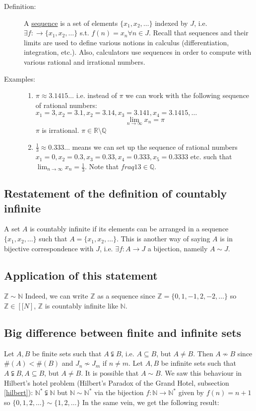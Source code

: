 	\label{lecture47}
	\begin{description}
		\item[Definition:] A \underline{sequence} is a set of elements $\{x_1, x_2, \dots\}$ indexed by $J$, i.e. $\exists f: \rightarrow \{x_1, x_2, \dots\}$ s.t. $f(n) = x_n \forall n \in J$.
			Recall that sequences and their limits are used to define various notions in calculus (differentiation, integration, etc.).
			Also, calculators use sequences in order to compute with various rational and irrational numbers.
		\item[Examples:]
			\begin{enumerate}
				\item $\pi \approx 3.1415\dots$ i.e. instead of $\pi$ we can work with the following sequence of rational numbers: $x_1 = 3, x_2 = 3.1, x_2 = 3.14, x_3 = 3.141, x_4 = 3.1415, \dots$
					$$\lim_{n \to \infty} x_n = \pi$$
					$\pi$ is irrational. $\pi \in \mathbb{R}\setminus\mathbb{Q}$
				\item $\frac{1}{3} \approx 0.333 \dots$ means we can set up the sequence of rational numbers $x_1 = 0, x_2 = 0.3, x_3 = 0.33, x_4 = 0.333, x_5 = 0.3333$ etc. such that $\lim_{n \to \infty} x_n = \frac{1}{3}$.
					Note that $fraq{1}{3}\in\mathbb{Q}$.
			\end{enumerate}
	\end{description}

	\subsection*{Restatement of the definition of countably infinite}
	A set $A$ is countably infinite if its elements can be arranged in a sequence $\{x_1, x_2, \dots\}$ such that $A = \{x_1, x_2, \dots\}$. This is another way of saying $A$ is in bijective correspondence with $J$, i.e. $\exists f: A \to J$ a bijection, nameily $A \sim J$.

	\subsection*{Application of this statement}	$\mathbb{Z}\sim\mathbb{N}$
	Indeed, we can write $\mathbb{Z}$ as a sequence since $\mathbb{Z} =\{0,1,-1,2,-2,\dots\}$ so $\mathbb{Z}\in[\mathbb[N]$, $\mathbb{Z}$ is countably infinite like $\mathbb{N}$.

	\subsection*{Big difference between finite and infinite sets}
	Let $A, B$ be finite sets such that $A\subsetneqq B$, i.e. $A \subseteq B$, but $A \neq B$.
	Then $A \nsim B$ since $\#(A) < \#(B)$ and $J_n \nsim J_m$ if $n \neq m$.
	Let $A, B$ be infinite sets such that $A\subsetneqq B, A \subseteq B$, but $A \neq B$.
	It is possible that $A \sim B$. We saw this behaviour in Hilbert's hotel problem (Hilbert's Paradox of the Grand Hotel, subsection \ref{hilbert}):
	$\mathbb{N}^\ast\subsetneqq\mathbb{N}$ but $\mathbb{N}\sim\mathbb{N}^\ast$ via the bijection $f:\mathbb{N}\to\mathbb{N}^\ast$ given by $f(n)=n+1$ so $\{0,1,2,\dots\}\sim\{1,2,\dots\}$
	In the same vein, we get the following result:
	
